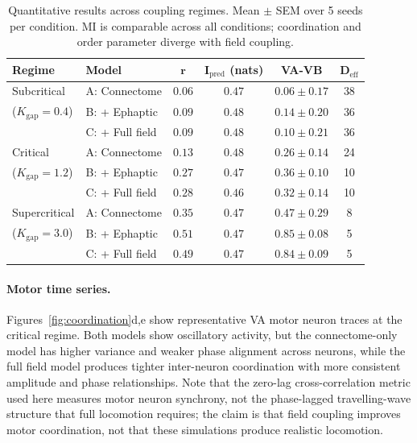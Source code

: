 \documentclass[12pt]{article}
\newcommand{\Deff}{D_{\mathrm{eff}}}
\begin{document}
\begin{table}[H]
\centering
\caption{Quantitative results across coupling regimes. Mean $\pm$ SEM over 5 seeds per condition. MI is comparable across all conditions; coordination and order parameter diverge with field coupling.}
\label{tab:results}
\begin{tabular}{l l c c c c}
\toprule
\textbf{Regime} & \textbf{Model} & $\boldsymbol{r}$ & $\boldsymbol{I_{\mathrm{pred}}}$ \textbf{(nats)} & \textbf{VA-VB} & $\boldsymbol{\Deff}$ \\
\midrule
Subcritical & A: Connectome & $0.06$ & $0.47$ & $0.06 \pm 0.17$ & 38 \\
($K_{\mathrm{gap}} = 0.4$) & B: + Ephaptic & $0.09$ & $0.48$ & $0.14 \pm 0.20$ & 36 \\
 & C: + Full field & $0.09$ & $0.48$ & $0.10 \pm 0.21$ & 36 \\
\midrule
Critical & A: Connectome & $0.13$ & $0.48$ & $0.26 \pm 0.14$ & 24 \\
($K_{\mathrm{gap}} = 1.2$) & B: + Ephaptic & $0.27$ & $0.47$ & $0.36 \pm 0.10$ & 10 \\
 & C: + Full field & $0.28$ & $0.46$ & $0.32 \pm 0.14$ & 10 \\
\midrule
Supercritical & A: Connectome & $0.35$ & $0.47$ & $0.47 \pm 0.29$ & 8 \\
($K_{\mathrm{gap}} = 3.0$) & B: + Ephaptic & $0.51$ & $0.47$ & $\mathbf{0.85 \pm 0.08}$ & 5 \\
 & C: + Full field & $0.49$ & $0.47$ & $\mathbf{0.84 \pm 0.09}$ & 5 \\
\bottomrule
\end{tabular}
\end{table}

\paragraph{Motor time series.} Figures~\ref{fig:coordination}d,e show representative VA motor neuron traces at the critical regime. Both models show oscillatory activity, but the connectome-only model has higher variance and weaker phase alignment across neurons, while the full field model produces tighter inter-neuron coordination with more consistent amplitude and phase relationships. Note that the zero-lag cross-correlation metric used here measures motor neuron synchrony, not the phase-lagged travelling-wave structure that full locomotion requires; the claim is that field coupling improves motor coordination, not that these simulations produce realistic locomotion.
\end{document}
